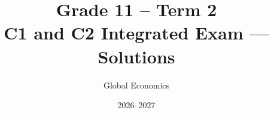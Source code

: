 \raggedbottom
\linespread{1.04}
\setlength{\parskip}{4pt}
\newcommand{\keytable}[2]{\par\noindent\begingroup\small\setlength{\tabcolsep}{4pt}\renewcommand{\arraystretch}{1.14}%
\begin{tabularx}{\linewidth}{#1}\toprule #2\bottomrule\end{tabularx}\par\endgroup}
\newcommand{\examtable}[2]{\par\noindent\begin{minipage}{\linewidth}\small
\renewcommand{\arraystretch}{1.08}\setlength{\tabcolsep}{3pt}
\begin{tabularx}{\linewidth}{#1}\toprule #2\bottomrule\end{tabularx}
\end{minipage}\par}
\newcommand{\taskprompt}[3]{\Needspace{5\baselineskip}\par\textbf{Original task: #1}\score{#2}\par #3\par}
\newenvironment{probleminfoexcerpt}{%
  \begin{list}{}{\setlength{\leftmargin}{1.5em}\setlength{\rightmargin}{1.5em}%
    \setlength{\topsep}{3pt}\setlength{\partopsep}{0pt}\setlength{\parsep}{0pt}}%
  \item\relax\small\raggedright}{\end{list}}
\newcommand{\worked}[2]{\subsection*{Worked solution: #1}\label{#2}}
\newcommand{\cOneA}{Identify the population and both samples: place, period and sizes. Pair and interpret population and sample means, standard deviations and proportions.}
\newcommand{\cOneB}{Calculate the changes in sample mean, standard deviation, and proportion from the initial to the second independent study. Interpret these differences, identifying which measures changed and which remained unchanged.}
\newcommand{\cTwoA}{Complete the C2 information table for the initial study: initially unknown and later established mean, known spread, sample statistics and procedure settings.}
\newcommand{\cTwoB}{For each requested confidence level, tabulate the initial point estimate, margin of error, separate endpoints, confidence interval and full width using the known population standard deviation.}
\newcommand{\cTwoC}{For subsequent studies only, calculate covering counts, observed coverage and absolute differences from nominal confidence (percentage points).}
\title{Grade 11 -- Term 2\\C1 and C2 Integrated Exam --- Solutions}
\author{Global Economics}
\date{2026--2027}

